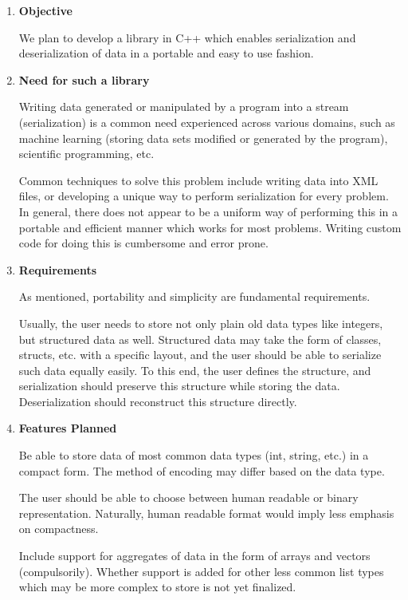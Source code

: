 \documentclass{article}
\begin{document}
\begin{enumerate}

\item \textbf{Objective}

  We plan to develop a library in C++ which enables serialization and
  deserialization of data in a portable and easy to use fashion.

\item \textbf{Need for such a library}

  Writing data generated or manipulated by a program into a stream
  (serialization) is a common need experienced across various domains,
  such as machine learning (storing data sets modified or generated by
  the program), scientific programming, etc.

  Common techniques to solve this problem include writing data into
  XML files, or developing a unique way to perform serialization for
  every problem. In general, there does not appear to be a uniform way
  of performing this in a portable and efficient manner which works
  for most problems. Writing custom code for doing this is cumbersome
  and error prone.

\item \textbf{Requirements}

  As mentioned, portability and simplicity are fundamental
  requirements.
  
  Usually, the user needs to store not only plain old data types like
  integers, but structured data as well. Structured data may take the
  form of classes, structs, etc. with a specific layout, and the user
  should be able to serialize such data equally easily. To this end,
  the user defines the structure, and serialization should preserve
  this structure while storing the data. Deserialization should
  reconstruct this structure directly.

\item \textbf{Features Planned}
  
  Be able to store data of most common data types (int, string, etc.)
  in a compact form. The method of encoding may differ based on the
  data type.

  The user should be able to choose between human readable or binary
  representation. Naturally, human readable format would imply less
  emphasis on compactness.
  
  Include support for aggregates of data in the form of arrays and
  vectors (compulsorily). Whether support is added for other less
  common list types which may be more complex to store is not yet
  finalized.
  
    
\end{enumerate}
\end{document}
